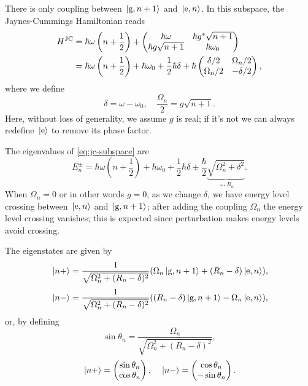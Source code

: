 \documentclass[hyperref, a4paper]{article}
\newcommand*{\kete}{\ket*{\text{e}}}
\begin{document}
There is only coupling between $\ket*{\text{g}, n+1}$ and $\ket*{\text{e}, n}$.
In this subspace, the Jaynes-Cummings Hamiltonian reads 
\begin{equation}
    \begin{aligned}
        H^{\text{JC}} &= \hbar \omega \left( n + \frac{1}{2} \right) + \pmqty{
            \hbar \omega  & \hbar g^* \sqrt{n+1} \\
            \hbar g \sqrt{n+1} & \hbar \omega_0
        } \\
        &= \hbar \omega \left( n + \frac{1}{2} \right) + \hbar \omega_0 + \frac{1}{2} \hbar \delta + \hbar 
        \pmqty{
            \delta / 2 & \Omega_n / 2 \\
            \Omega_n / 2 & - \delta / 2
        },
    \end{aligned}
    \label{eq:jc-subspace}
\end{equation}
where we define 
\begin{equation}
    \delta = \omega - \omega_0, \quad \frac{\Omega_n}{2} = g \sqrt{n+1}.
    \label{eq:omega-delta-def}
\end{equation}
Here, without loss of generality, we assume $g$ is real;
if it's not we can always redefine $\kete$ to remove its phase factor.

The eigenvalues of \eqref{eq:jc-subspace} are 
\begin{equation}
    E^{\pm}_n = \hbar \omega \left( n + \frac{1}{2} \right) + \hbar \omega_0 + \frac{1}{2} \hbar \delta
    \pm \frac{\hbar}{2} \underbrace{\sqrt{\Omega_n^2 + \delta^2}}_{\eqqcolon R_n}.
\end{equation}
When $\Omega_n = 0$ or in other words $g=0$,
as we change $\delta$, we have energy level crossing between $\ket*{\text{e},n}$ and $\ket*{\text{g},n+1}$;
after adding the coupling $\Omega_n$ the energy level crossing vanishes;
this is expected since perturbation makes energy levels avoid crossing. 

The eigenstates are given by 
\begin{equation}
    \ket*{n+} = \frac{1}{\sqrt{\Omega_n^2 + (R_n - \delta)^2}} (\Omega_n \ket*{\text{g},n+1} + (R_n - \delta) \ket*{\text{e},n}),
\end{equation}
\begin{equation}
    \ket*{n-} = \frac{1}{\sqrt{\Omega_n^2 + (R_n - \delta)^2}} ((R_n - \delta) \ket*{\text{g},n+1} - \Omega_n \ket*{\text{e},n}) ,
\end{equation}
or, by defining 
\begin{equation}
    \sin \theta_n = \frac{\Omega_n}{\sqrt{\Omega_n^2 + (R_n - \delta)^2}},
\end{equation}
\begin{equation}
    \ket*{n+} = \pmqty{\sin \theta_n \\ \cos \theta_n}, \quad 
    \ket*{n-} = \pmqty{\cos \theta_n \\ - \sin \theta_n}.
\end{equation}
\end{document}
